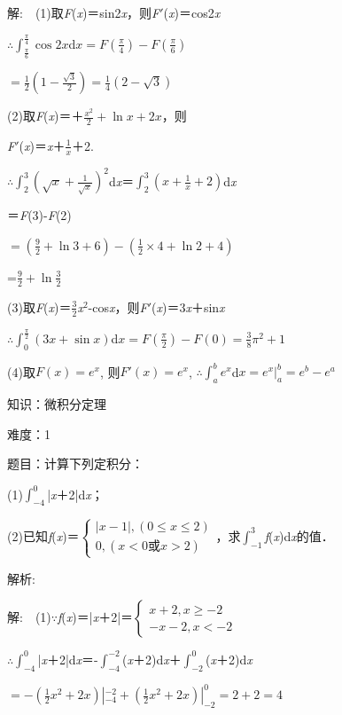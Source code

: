 \documentclass{article} %
\begin{document}
 解:　(1)取\textit{F}(\textit{x})＝sin2\textit{x}，则\textit{F}$'$(\textit{x})＝cos2\textit{x}

$\therefore\int_{\frac{\pi}{6}}^{\frac{\pi}{4}}\cos 2x$d$x=F(\frac{\pi}{4})-F(\frac{\pi}{6})$

$=\frac{1}{2}(1-\frac{\sqrt{3}}{2})=\frac{1}{4}(2-\sqrt{3})$

(2)取\textit{F}(\textit{x})＝＋$\frac{x^2}{2}+\ln x+2x$，则

\textit{F}$'$(\textit{x})＝\textit{x}＋$\frac{1}{x}$＋2.

$\mathrm{\therefore}\int_2^3(\sqrt{x}+\frac{1}{\sqrt{x}})^2$d\textit{x}＝$\int_2^3(x+\frac{1}{x}+2)$d\textit{x}

＝\textit{F}(3)-\textit{F}(2)

$=(\frac{9}{2}+\ln 3+6)-(\frac{1}{2}\times 4+\ln 2+4)$

=$\frac{9}{2}+\ln\frac{3}{2}$

(3)取\textit{F}(\textit{x})＝$\frac{3}{2}$\textit{x}${}^{2}$-cos\textit{x}，则\textit{F}$'$(\textit{x})＝3\textit{x}＋sin\textit{x}

$\therefore\int_0^{\frac{\pi}{2}}(3x+\sin x)$d$x=F(\frac{\pi}{2})-F(0)=\frac{3}{8}\pi^2+1$

(4)取$F(x)=e^x$, 则$F'(x)=e^x$, $\therefore\int_a^b e^x$d$x=e^x|_a^b=e^b-e^a$

 知识：微积分定理

 难度：1

 题目：计算下列定积分：

(1)$\int_{-4}^{0}$|\textit{x}＋2|d\textit{x}；

(2)已知\textit{f}(\textit{x})＝$\left\{\begin{array}{l}|x-1|, (0\le x\le 2)\\0, (x<0\text{或}x>2)\end{array}\right.$，求$\int_{-1}^{3}$\textit{f}(\textit{x})d\textit{x}的值．

 解析:

 解:　(1)$\mathrm{\because}$\textit{f}(\textit{x})＝|\textit{x}＋2|＝$\left\{\begin{array}{l}x+2, x\ge -2\\-x-2, x<-2\end{array}\right.$

$\mathrm{\therefore}$$\int_{-4}^{0}$|\textit{x}＋2|d\textit{x}＝-$\int_{-4}^{-2}$(\textit{x}＋2)d\textit{x}＋$\int_{-2}^{0}$(\textit{x}＋2)d\textit{x}

$=-(\frac{1}{2}x^2+2x)|_{-4}^{-2}+(\frac{1}{2}x^2+2x)|_{-2}^0=2+2=4$
\end{document}
